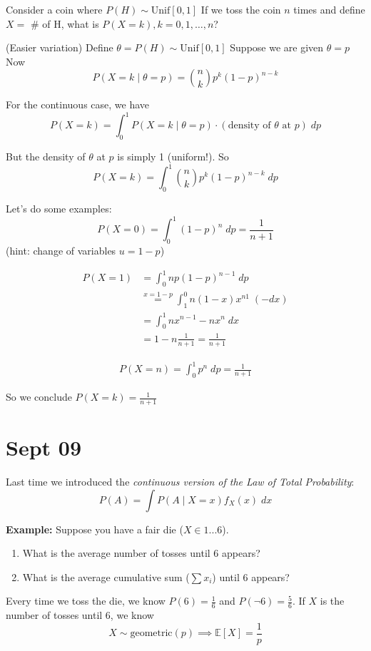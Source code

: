\documentclass[12pt]{article}
\newcommand{\E}{\mathbb{E}}
\begin{document}
    Consider a coin where $P(H) \sim \text{Unif}[0, 1]$ If we toss the coin $n$ times and define $X = $ \# of H, what is $P(X = k), k = 0, 1, \dots, n$?

    (Easier variation) Define $\theta = P(H) \sim \text{Unif}[0, 1]$ Suppose we are given $\theta = p$ Now 
    \[P(X = k \; | \; \theta = p) = \binom{n}{k} p^k (1 -p)^{n-k}\]

    For the continuous case, we have 
    \[P(X = k) = \int_0^1 P(X = k \; | \; \theta = p) \cdot (\text{density of } \theta \text{ at } p)\; dp\]

    But the density of $\theta$ at $p$ is simply 1 (uniform!). So
    \[P(X = k) = \int_0^1 \binom{n}{k} p^k (1 - p)^{n-k} \; dp\]
    
    Let's do some examples:
    \[P(X = 0) = \int_0^1 (1 - p)^n \; dp = \frac{1}{n + 1}\]
    (hint: change of variables $u = 1 - p$)

    \begin{align*}
        P(X = 1) &= \int_0^1 n p(1-p)^{n-1} \; dp\\ 
        &\overset{x = 1 - p}{=} \int_1^0 n(1 - x)x^{n1}\; (-dx)\\ 
        &= \int_0^1 nx^{n-1} - nx^n\; dx\\ 
        &= 1  - n \frac{1}{n + 1} = \frac{1}{n + 1}
    \end{align*}

    \begin{align*}
        P(X = n) = \int_0^1 p^n \; dp = \frac{1}{n + 1}
    \end{align*}

    So we conclude $P(X = k) = \frac{1}{n + 1}$

\section{Sept 09}
    Last time we introduced the \emph{continuous version of the Law of Total Probability}:
    \[P(A) = \int P(A \; | \; X = x) f_X(x)\; dx\]

    \textbf{Example:} Suppose you have a fair die ($X \in 1...6$). 
    \begin{enumerate}
        \item What is the average number of tosses until 6 appears?
        \item What is the average cumulative sum ($\sum x_i$) until 6 appears?
    \end{enumerate}

    Every time we toss the die, we know $P(6) = \frac{1}{6}$ and $P(\lnot 6) = \frac{5}{6}$. If $X$ is the number of tosses until 6, we know 
    \[X \sim \text{geometric}(p) \implies \E[X] = \frac{1}{p}\]
\end{document}
